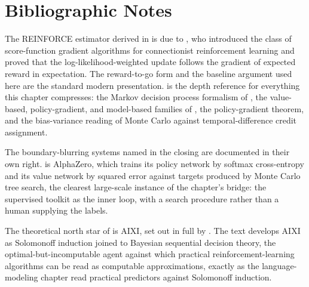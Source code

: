 
\section*{Bibliographic Notes}

The REINFORCE estimator derived in  is due to
\textcite{williams1992reinforce}, who introduced the class of
score-function gradient algorithms for connectionist reinforcement learning
and proved that the log-likelihood-weighted update follows the gradient of
expected reward in expectation. The reward-to-go form and the baseline
argument used here are the standard modern presentation.
\textcite{sutton2018rl} is the depth reference for everything this chapter
compresses: the Markov decision process formalism of , the
value-based, policy-gradient, and model-based families of
, the policy-gradient theorem, and the
bias-variance reading of Monte Carlo against temporal-difference credit
assignment.

The boundary-blurring systems named in the closing are documented in their
own right. \textcite{silver2017alphazero} is AlphaZero, which trains its
policy network by softmax cross-entropy and its value network by squared
error against targets produced by Monte Carlo tree search, the clearest
large-scale instance of the chapter's bridge: the supervised toolkit as the
inner loop, with a search procedure rather than a human supplying the labels.

The theoretical north star of  is AIXI, set out in full by
\textcite{hutter2005uai}. The text develops AIXI as Solomonoff induction
joined to Bayesian sequential decision theory, the optimal-but-incomputable
agent against which practical reinforcement-learning algorithms can be read
as computable approximations, exactly as the language-modeling chapter read
practical predictors against Solomonoff induction.
